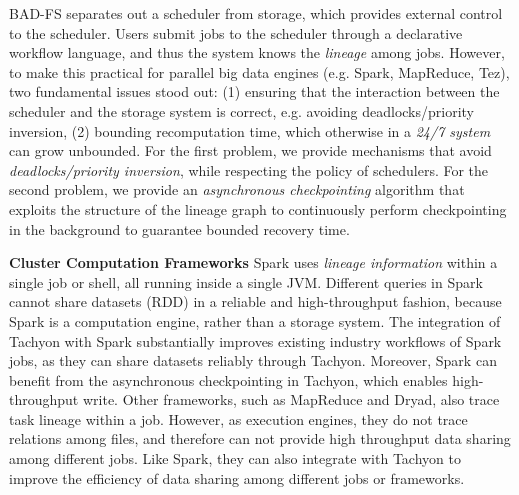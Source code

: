\documentclass[twocolumn]{article}
\begin{document}
BAD-FS separates out a scheduler from storage, which provides external control to the scheduler. 
Users submit jobs to the scheduler through a declarative workflow language, 
and thus the system knows the \textit{lineage} among jobs. 
However, to make this practical for parallel big data engines (e.g. Spark, MapReduce, Tez), two fundamental issues stood out: (1) ensuring that the interaction between the scheduler and the storage system is correct, e.g. avoiding deadlocks/priority inversion, (2) bounding recomputation time, which otherwise in a \textit{24/7 system} can grow unbounded. 
For the first problem, we provide mechanisms that avoid \textit{deadlocks/priority inversion}, while respecting the policy of schedulers. For the second problem, we provide an \textit{asynchronous checkpointing} algorithm that exploits the structure of the lineage graph to continuously perform checkpointing in the background to guarantee bounded recovery time.

\noindent
\textbf{Cluster Computation Frameworks} 
Spark uses \textit{lineage information} within a single job or shell, all running inside a single JVM. 
Different queries in Spark cannot share datasets (RDD) in a reliable and high-throughput fashion, 
because Spark is a computation engine, rather than a storage system. 
The integration of Tachyon with Spark substantially improves existing industry workflows of Spark jobs, 
as they can share datasets reliably through Tachyon. 
Moreover, Spark can benefit from the asynchronous checkpointing in Tachyon, which enables high-throughput write.
Other frameworks, such as MapReduce and Dryad, also trace task lineage within a job. 
However, as execution engines, they do not trace relations among files, 
and therefore can not provide high throughput data sharing among different jobs. 
Like Spark, they can also integrate with Tachyon to improve the efficiency of data sharing among different jobs or frameworks.
\end{document}
